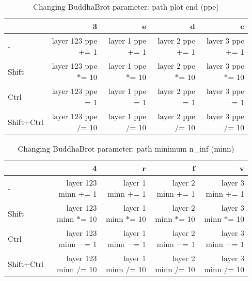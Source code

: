 \documentclass[10pt,a4paper]{article}
\begin{document}
\begin{table}[h!]
    \caption{Changing BuddhaBrot parameter: path plot end (ppe)}
    \setlength{\tabcolsep}{0.0pt}
    \begin{tabularx}{\linewidth}{lRRRR}
        \toprule
                   & 3                      & e                    & d                    & c                    \\
        \midrule                                                                          
        -          & layer 123 ppe $+$= 1  & layer 1 ppe $+$= 1  & layer 2 ppe $+$= 1  & layer 3 ppe $+$= 1  \\
        Shift      & layer 123 ppe $*$= 10 & layer 1 ppe $*$= 10 & layer 2 ppe $*$= 10 & layer 3 ppe $*$= 10 \\
        Ctrl       & layer 123 ppe $-$= 1  & layer 1 ppe $-$= 1  & layer 2 ppe $-$= 1  & layer 3 ppe $-$= 1  \\
        Shift+Ctrl & layer 123 ppe $/$= 10 & layer 1 ppe $/$= 10 & layer 2 ppe $/$= 10 & layer 3 ppe $/$= 10 \\
        \bottomrule
    \end{tabularx}
\end{table}

\begin{table}[h!]
    \caption{Changing BuddhaBrot parameter: path minimum n\_inf (minn)}
    \setlength{\tabcolsep}{0.0pt}
    \begin{tabularx}{\linewidth}{lRRRR}
        \toprule
                   & 4                      & r                    & f                    & v                    \\
        \midrule                                                                          
        -          & layer 123 minn $+$= 1  & layer 1 minn $+$= 1  & layer 2 minn $+$= 1  & layer 3 minn $+$= 1  \\
        Shift      & layer 123 minn $*$= 10 & layer 1 minn $*$= 10 & layer 2 minn $*$= 10 & layer 3 minn $*$= 10 \\
        Ctrl       & layer 123 minn $-$= 1  & layer 1 minn $-$= 1  & layer 2 minn $-$= 1  & layer 3 minn $-$= 1  \\
        Shift+Ctrl & layer 123 minn $/$= 10 & layer 1 minn $/$= 10 & layer 2 minn $/$= 10 & layer 3 minn $/$= 10 \\
        \bottomrule
    \end{tabularx}
\end{table}
\end{document}
